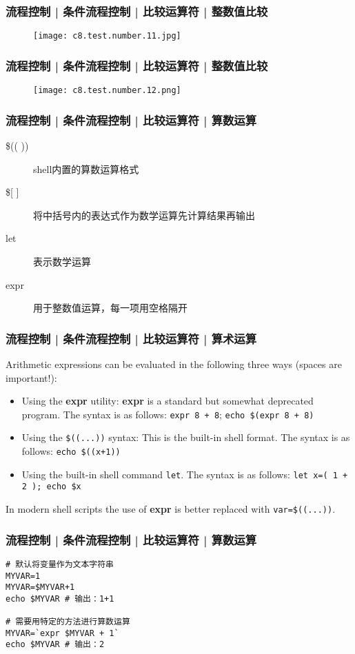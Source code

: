 \begin{frame}
  \frametitle{流程控制 | 条件流程控制 | 比较运算符 | 整数值比较}
  \begin{figure}
    \centering
    \texttt{[image: c8.test.number.11.jpg]}
  \end{figure}
\end{frame}

\begin{frame}
  \frametitle{流程控制 | 条件流程控制 | 比较运算符 | 整数值比较}
  \begin{figure}
    \centering
    \texttt{[image: c8.test.number.12.png]}
  \end{figure}
\end{frame}

\begin{frame}[fragile]
  \frametitle{流程控制 | 条件流程控制 | 比较运算符 | \alert{算数运算}}
  \begin{description}
    \item[\$(( ))] shell内置的算数运算格式
    \item[\${[} {]}] 将中括号内的表达式作为数学运算先计算结果再输出
    \item[let] 表示数学运算
    \item[expr] 用于整数值运算，每一项用空格隔开
  \end{description}
\end{frame}

\begin{frame}[fragile]
  \frametitle{流程控制 | 条件流程控制 | 比较运算符 | 算术运算}
  Arithmetic expressions can be evaluated in the following three ways (spaces are important!):
  \begin{itemize}
    \item Using the \textbf{expr} utility: \textbf{expr} is a standard but somewhat deprecated program. The syntax is as follows: \verb|expr 8 + 8|; \verb|echo $(expr 8 + 8)|
    \item Using the \verb|$((...))| syntax: This is the built-in shell format. The syntax is as follows: \verb|echo $((x+1))|
    \item Using the built-in shell command \verb|let|.  The syntax is as follows: \verb|let x=( 1 + 2 ); echo $x|
  \end{itemize}
  In modern shell scripts the use of \textbf{expr} is better replaced with \verb|var=$((...))|.
\end{frame}

\begin{frame}[fragile]
  \frametitle{流程控制 | 条件流程控制 | 比较运算符 | 算数运算}
\begin{lstlisting}
# 默认将变量作为文本字符串
MYVAR=1
MYVAR=$MYVAR+1
echo $MYVAR # 输出：1+1

# 需要用特定的方法进行算数运算
MYVAR=`expr $MYVAR + 1`
echo $MYVAR # 输出：2
\end{lstlisting}
\end{frame}

